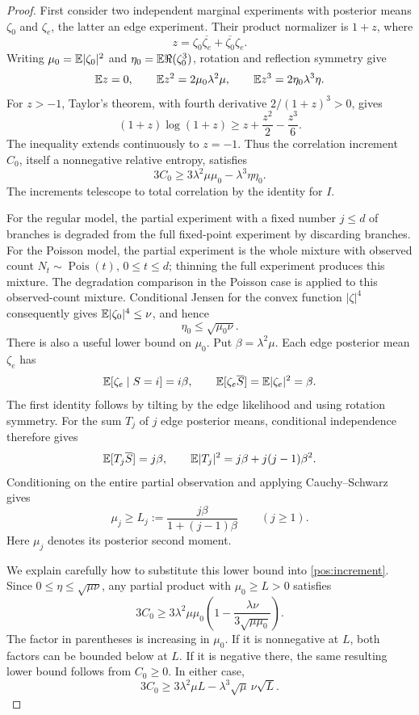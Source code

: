 \begin{proof}
First consider two independent marginal experiments with posterior means
\(\zeta_0\) and \(\zeta_e\), the latter an edge experiment. Their product
normalizer is \(1+z\), where
\[
 z=\zeta_0\overline{\zeta_e}+\overline{\zeta_0}\zeta_e.
\]
Writing \(\mu_0=\mathbb E|\zeta_0|^2\) and
\(\eta_0=\mathbb E\Re(\zeta_0^3)\), rotation and reflection symmetry give
\[
 \mathbb E z=0,\qquad \mathbb E z^2=2\mu_0\lambda^2\mu,
 \qquad \mathbb E z^3=2\eta_0\lambda^3\eta.
\]
For \(z>-1\), Taylor's theorem, with fourth derivative
\(2/(1+z)^3>0\), gives
\[
 (1+z)\log(1+z)\ge z+\frac{z^2}{2}-\frac{z^3}{6}.
\]
The inequality extends continuously to \(z=-1\). Thus the correlation
increment \(C_0\), itself a nonnegative relative entropy, satisfies
\begin{equation}\label{pos:increment}
 3C_0\ge3\lambda^2\mu\mu_0-\lambda^3\eta\eta_0.
\end{equation}
The increments telescope to total correlation by the identity for \(I\).

For the regular model, the partial experiment with a fixed number
\(j\le d\) of branches is degraded from the full fixed-point experiment
by discarding branches. For the Poisson model, the partial experiment
is the whole mixture with observed count \(N_t\sim\operatorname{Pois}(t)\),
\(0\le t\le d\); thinning the full experiment produces this mixture.
The degradation comparison in the Poisson case is applied to this
observed-count mixture. Conditional Jensen for the convex function
\(|\zeta|^4\) consequently gives
\(\mathbb E|\zeta_0|^4\le\nu\), and hence
\[
 \eta_0\le\sqrt{\mu_0\nu}.
\]
There is also a useful lower bound on \(\mu_0\). Put
\(\beta=\lambda^2\mu\). Each edge posterior mean \(\zeta_e\) has
\[
 \mathbb E[\zeta_e\mid S=i]=i\beta,\qquad
 \mathbb E[\zeta_e\overline S]=\mathbb E|\zeta_e|^2=\beta.
\]
The first identity follows by tilting by the edge likelihood and using
rotation symmetry. For the sum \(T_j\) of \(j\) edge posterior means,
conditional independence therefore gives
\[
 \mathbb E[T_j\overline S]=j\beta,\qquad
 \mathbb E|T_j|^2=j\beta+j(j-1)\beta^2.
\]
Conditioning on the entire partial observation and applying
Cauchy--Schwarz gives
\begin{equation}\label{pos:projection}
 \mu_j\ge L_j:=\frac{j\beta}{1+(j-1)\beta}\qquad(j\ge1).
\end{equation}
Here \(\mu_j\) denotes its posterior second moment.

We explain carefully how to substitute this lower bound into
\eqref{pos:increment}. Since \(0\le\eta\le\sqrt{\mu\nu}\), any
partial product with \(\mu_0\ge L>0\) satisfies
\[
 3C_0\ge3\lambda^2\mu\mu_0
  \left(1-\frac{\lambda\nu}{3\sqrt{\mu\mu_0}}\right).
\]
The factor in parentheses is increasing in \(\mu_0\). If it is
nonnegative at \(L\), both factors can be bounded below at \(L\).
If it is negative there, the same resulting lower bound follows from
\(C_0\ge0\). In either case,
\begin{equation}\label{pos:truncated-bound}
 3C_0\ge3\lambda^2\mu L-\lambda^3\sqrt\mu\,\nu\sqrt L.
\end{equation}


\end{proof}
